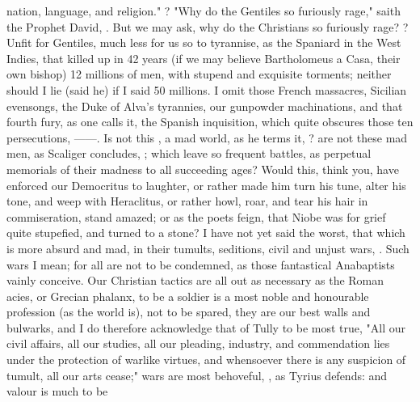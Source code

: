 nation, language, and religion." ?
"Why do the Gentiles so furiously rage," saith the Prophet David,
. But we may ask, why do the Christians so furiously
rage? ?
Unfit for Gentiles, much less for us so to tyrannise, as the Spaniard in the
West Indies, that killed up in 42 years (if we may believe
Bartholomeus a Casa, their own bishop) 12 millions of men,
with stupend and exquisite torments; neither should I lie (said he) if I said
50 millions. I omit those French massacres, Sicilian evensongs,
the Duke of Alva's tyrannies, our gunpowder machinations,
and that fourth fury, as one calls it, the Spanish
inquisition, which quite obscures those ten persecutions,
------. Is not this
, a mad world, as he terms it,
? are not these mad men, as Scaliger
concludes, ; which leave so frequent battles, as
perpetual memorials of their madness to all succeeding ages? Would this, think
you, have enforced our Democritus to laughter, or rather made him turn his
tune, alter his tone, and weep with Heraclitus, or rather
howl, roar, and tear his hair in commiseration, stand
amazed; or as the poets feign, that Niobe was for grief quite stupefied, and
turned to a stone? I have not yet said the worst, that which is more absurd and
mad, in their tumults, seditions, civil and unjust wars,
.
Such wars I mean; for all are not to be condemned, as those fantastical
Anabaptists vainly conceive. Our Christian tactics are all out as necessary as
the Roman acies, or Grecian phalanx, to be a soldier is a most noble and
honourable profession (as the world is), not to be spared, they are our best
walls and bulwarks, and I do therefore acknowledge that of
Tully to be most true, "All our civil affairs, all our
studies, all our pleading, industry, and commendation lies under the protection
of warlike virtues, and whensoever there is any suspicion of tumult, all our
arts cease;" wars are most behoveful, , as Tyrius defends: and valour is much to be
